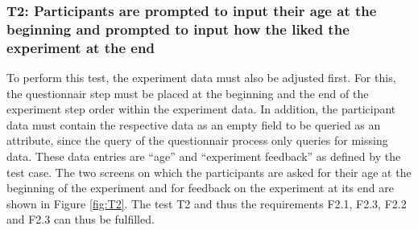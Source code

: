 \newpage

\subsubsection*{T2: Participants are prompted to input their age at the beginning and prompted to input how the liked the experiment at the end}

To perform this test, the experiment data must also be adjusted first. For this, the questionnair step must be placed at the beginning and the end of the experiment step order within the experiment data. In addition, the participant data must contain the respective data as an empty field to be queried as an attribute, since the query of the questionnair process only queries for missing data. These data entries are \enquote{age} and \enquote{experiment feedback} as defined by the test case. The two screens on which the participants are asked for their age at the beginning of the experiment and for feedback on the experiment at its end are shown in Figure \ref{fig:T2}. The test T2 and thus the requirements F2.1, F2.3, F2.2 and F2.3 can thus be fulfilled.


